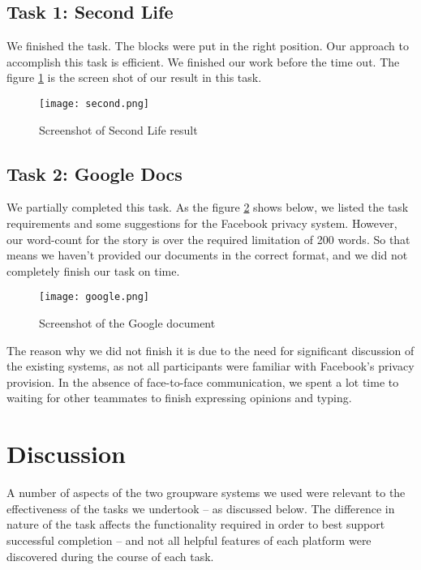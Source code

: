 \documentclass{acm_proc_article-sp}
\begin{document}
\subsection{Task 1: Second Life}
We finished the task. The blocks were put in the right position. Our approach to accomplish this task is efficient. We finished our work before the time out. The figure \ref{second} is the screen shot of our result in this task.


\begin{figure}[t]
\centering
\texttt{[image: second.png]}
\caption{Screenshot of Second Life result\label{second}}
\end{figure}

\subsection{Task 2: Google Docs}
We partially completed this task. As the figure \ref{google} shows below, we listed the task requirements and some suggestions for the Facebook privacy system. However, our word-count for the story is over the required limitation of 200 words. So that means we haven't provided our documents in the correct format, and we did not completely finish our task on time. 

\begin{figure}[t]
\centering
\texttt{[image: google.png]}
\caption{Screenshot of the Google document\label{google}}
\end{figure}

The reason why we did not finish it is due to the need for significant discussion of the existing systems, as not all participants were familiar with Facebook's privacy provision. In the absence of face-to-face communication, we spent a lot time to waiting for other teammates to finish expressing opinions and typing.


\section{Discussion}

A number of aspects of the two groupware systems we used were relevant to the effectiveness of the tasks we undertook -- as discussed below. The difference in nature of the task affects the functionality required in order to best support successful completion \cite{straus1999testing} -- and not all helpful features of each platform were discovered during the course of each task.
\end{document}
